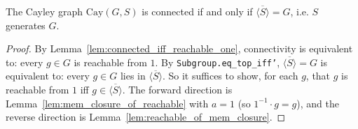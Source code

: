 \begin{theorem}
    \label{thm:main}
    \leanok
    The Cayley graph $\mathrm{Cay}(G,S)$ is connected if and only if
    $\overline{\langle S \rangle} = G$, i.e. $S$ generates $G$.
\end{theorem}
\begin{proof}
    By Lemma~\ref{lem:connected_iff_reachable_one}, connectivity is equivalent to:
    every $g \in G$ is reachable from $1$. By \texttt{Subgroup.eq\_top\_iff'},
    $\overline{\langle S \rangle} = G$ is equivalent to: every $g \in G$ lies in
    $\overline{\langle S \rangle}$. So it suffices to show, for each $g$, that $g$ is
    reachable from $1$ iff $g \in \overline{\langle S \rangle}$. The forward direction
    is Lemma~\ref{lem:mem_closure_of_reachable} with $a = 1$ (so $1^{-1} \cdot g = g$),
    and the reverse direction is Lemma~\ref{lem:reachable_of_mem_closure}.
\end{proof}


